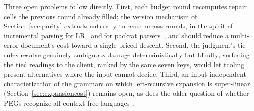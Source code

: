 \documentclass[manuscript]{acmart}
\begin{document}
Three open problems follow directly. First, each budget round recomputes repair cells the previous round already filled; the version mechanism of Section~\ref{sec:purity} extends naturally to reuse across rounds, in the spirit of incremental parsing for LR~\cite{larcheveque1995} and for packrat parsers~\cite{dubroy2017}, and should reduce a multi-error document's cost toward a single priced descent. Second, the judgment's tie rules resolve genuinely ambiguous damage deterministically but blindly; surfacing the tied readings to the client, ranked by the same seven keys, would let tooling present alternatives where the input cannot decide. Third, an input-independent characterization of the grammars on which left-recursive expansion is super-linear (Section~\ref{sec:expansioncost}) remains open, as does the older question of whether PEGs recognize all context-free languages~\cite{ford2004}.



\end{document}
